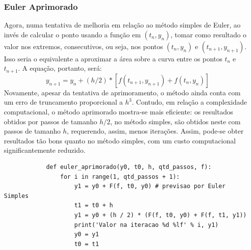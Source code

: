 \documentclass{article}
\begin{document}
\begin{otherlanguage}{brazil}
        \subsubsection{Euler Aprimorado}
            Agora, numa tentativa de melhoria em relação ao método simples de Euler, ao invés de calcular o ponto usando a função em $(t_n, y_n)$, tomar como resultado o valor nos extremos, consecutivos, ou seja, nos pontos $(t_n, y_n)$ e $(t_{n+1}, y_{n+1})$. Isso seria o equivalente a aproximar a área sobre a curva entre os pontos $t_n$ e $t_{n+1}$. A equação, portanto, será:\newline
            \begin{equation}
                y_{n+1} = y_n + (h / 2) * [f(t_{n+1}, y_{n+1}) + f(t_{n}, y_{n})]
            \end{equation}
            Novamente, apesar da tentativa de aprimoramento, o método ainda conta com um erro de truncamento proporcional a $h^3$. Contudo, em relação a complexidade computacional, o método aprimorado mostra-se mais eficiente: os resultados obtidos por passos de tamanho $h/2$, no método simples, são obtidos neste com passos de tamanho $h$, requerendo, assim, menos iterações. Assim, pode-se obter resultados tão bons quanto no método simples, com um custo computacional significantemente reduzido.\newline
            \begin{lstlisting}
            def euler_aprimorado(y0, t0, h, qtd_passos, f):
                for i in range(1, qtd_passos + 1):
                    y1 = y0 + F(f, t0, y0) # previsao por Euler Simples
                    t1 = t0 + h
                    y1 = y0 + (h / 2) * (F(f, t0, y0) + F(f, t1, y1))
                    print('Valor na iteracao %d %lf' % i, y1)
                    y0 = y1
                    t0 = t1
            \end{lstlisting}

\end{otherlanguage}
\end{document}
